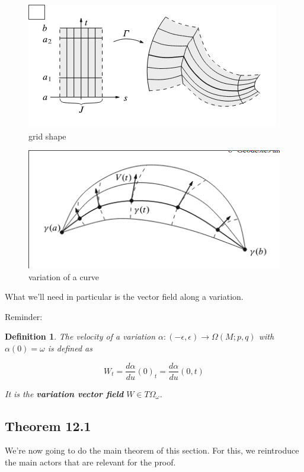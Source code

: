 \documentclass{article}
\newtheorem{def}{Definition}
\begin{document}
\begin{figure}
    \includegraphics{img/grid.png}
    \caption{grid shape}
    \label{fig:grid}
\end{figure}
\begin{figure}
    \includegraphics{img/sail.png}
    \caption{variation of a curve}
    \label{fig:sail}
\end{figure}



What we'll need in particular is the vector field along a variation.

Reminder:

\begin{def}
\label{def:vel_of_var}
    The velocity of a variation $\alpha: (-\epsilon, \epsilon) \rightarrow \Omega(M;p,q)$ with
    $\alpha(0) = \omega$ is defined as

    \[ W_t = \frac{d\alpha}{du}(0)_t = \frac{d\alpha}{du}(0, t) \]

    It is the \textbf{variation vector field} $W \in T\Omega_{\omega}$.
\end{def}






\subsection{Theorem 12.1}

We're now going to do the main theorem of this section.
For this, we reintroduce the main actors that are relevant for the proof.
\end{document}
